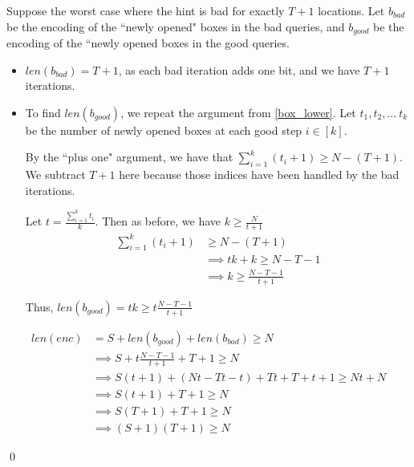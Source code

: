 Suppose the worst case where the hint is bad for exactly $T+1$ locations. Let $b_{bad}$ be the encoding of the ``newly opened" boxes in the bad queries, and $b_{good}$ be the encoding of the ``newly opened boxes in the good queries.
\begin{itemize}
    \item $len(b_{bad}) = T + 1$, as each bad iteration adds one bit, and we have $T+1$ iterations.
    \item To find $len(b_{good})$, we repeat the argument from \ref{box_lower}. Let $t_1, t_2, ...\ t_k$ be the number of newly opened boxes at each good step $i \in [k]$.

    By the ``plus one" argument, we have that $\sum_{i = 1}^k (t_i + 1)\ge N - (T + 1)$. We subtract $T + 1$ here because those indices have been handled by the bad iterations.
    
    Let $t = \frac{\sum_{i = 1}^k t_i}{k}$. Then as before, we have $k\ge \frac{N}{t+1}$
    \begin{align*}
        \sum_{i = 1}^k (t_i + 1)&\ge N - (T + 1) \\
        &\implies tk + k \ge N - T - 1 \\
        &\implies k \ge \frac{N - T - 1}{t+1}
    \end{align*}

    Thus, $len(b_{good}) = tk \ge t\frac{N - T - 1}{t+1}$
\end{itemize}

\begin{align*}
    len(enc) &= S + len(b_{good}) + len(b_{bad}) \ge N \\
    &\implies S + t\frac{N - T - 1}{t+1} + T + 1 \ge N \\
    &\implies S(t+1) + (Nt - Tt - t) + Tt + T + t + 1 \ge Nt + N \\
    &\implies S(t+1) + T + 1 \ge N\\
    &\implies S(T+1) + T + 1 \ge N \tag{As $t$ upper bounded by $T$} \\
    &\implies (S+1)(T+1) \ge N
\end{align*}

\qed
